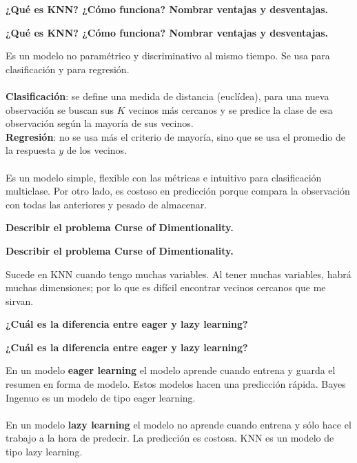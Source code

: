 \documentclass[10pt]{memoir}
\begin{document}
\clearpage
\begin{center}
	\textbf{\Large ¿Qué es KNN? ¿Cómo funciona? Nombrar ventajas y desventajas.} \\
\end{center}

\clearpage
\begin{center}
	\textbf{\Large ¿Qué es KNN? ¿Cómo funciona? Nombrar ventajas y desventajas.} \\
\end{center}
\noindent Es un modelo no paramétrico y discriminativo al mismo tiempo. Se usa para clasificación y para regresión. \\
\\
\noindent \textbf{Clasificación}: se define una medida de distancia (euclídea), para una nueva observación se buscan sus $K$ vecinos más cercanos y se predice la clase de esa observación según la mayoría de sus vecinos. \\
\textbf{Regresión}: no se usa más el criterio de mayoría, sino que se usa el promedio de la respuesta $y$ de los vecinos. \\
\\
\noindent Es un modelo simple, flexible con las métricas e intuitivo para clasificación multiclase. Por otro lado, es costoso en predicción porque compara la observación con todas las anteriores y pesado de almacenar.

\clearpage
\begin{center}
	\textbf{\Large Describir el problema Curse of Dimentionality.} \\
\end{center}

\clearpage
\begin{center}
	\textbf{\Large Describir el problema Curse of Dimentionality.} \\
\end{center}
\noindent Sucede en KNN cuando tengo muchas variables. Al tener muchas variables, habrá muchas dimensiones; por lo que es difícil encontrar vecinos cercanos que me sirvan.

\clearpage
\begin{center}
	\textbf{\Large ¿Cuál es la diferencia entre eager y lazy learning?} \\
\end{center}

\clearpage
\begin{center}
	\textbf{\Large ¿Cuál es la diferencia entre eager y lazy learning?} \\
\end{center}
\noindent En un modelo \textbf{eager learning} el modelo aprende cuando entrena y guarda el resumen en forma de modelo. Estos modelos hacen una predicción rápida. Bayes Ingenuo es un modelo de tipo eager learning. \\
\\
\noindent En un modelo \textbf{lazy learning} el modelo no aprende cuando entrena y sólo hace el trabajo a la hora de predecir. La predicción es costosa. KNN es un modelo de tipo lazy learning.
\end{document}
